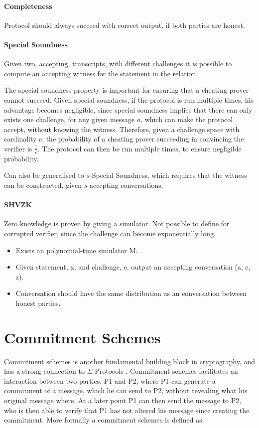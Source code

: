 \paragraph{Completeness}
Protocol should always succeed with correct output, if both parties are honest.

\paragraph{Special Soundness}
Given two, accepting, transcripts, with different challenges it is possible to
compute an accepting witness for the statement in the relation.

The special soundness property is important for ensuring that a cheating prover
cannot succeed. Given special soundness, if the protocol is run multiple times,
his advantage becomes negligible, since special soundness implies that there can
only exists one challenge, for any given message $a$, which can make the
protocol accept, without knowing the witness. Therefore, given a challenge space
with cardinality $c$, the probability of a cheating prover succeeding in
convincing the verifier is $\frac{1}{c}$. The protocol can then be run multiple
times, to ensure negligible probability.

Can also be generalised to $s$-Special Soundness, which requires that the
witness can be constructed, given $s$ accepting conversations.

\paragraph{SHVZK}
Zero knowledge is proven by giving a simulator. Not possible to define for
corrupted verifier, since the challenge can become exponentially long.
\begin{itemize}
  \item Exists an polynomial-time simulator M.
  \item Given statement, x, and challenge, e, output an accepting
    conversation (a, e, z).
  \item Conversation should have the same distribution as an conversation
    between honest parties.
\end{itemize}




\section{Commitment Schemes}
\label{sec:background:commitment}
Commitment schemes is another fundamental building block in cryptography, and
has a strong connection to $\Sigma$-Protocols . Commitment
schemes facilitates an interaction between two parties, P1 and P2, where P1 can
generate a commitment of a message, which he can send to P2, without revealing
what his original message where. At a later point P1 can then send the message
to P2, who is then able to verify that P1 has not altered his message since
creating the commitment. More formally a commitment schemes is defined as:

